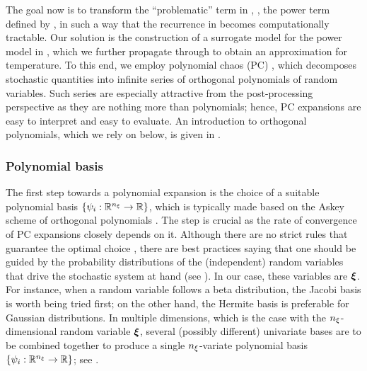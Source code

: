 The goal now is to transform the ``problematic'' term in , \ie, the power term defined by , in such a way that the recurrence in  becomes computationally tractable.
Our solution is the construction of a surrogate model for the power model in , which we further propagate through  to obtain an approximation for temperature.
To this end, we employ polynomial chaos (PC) \cite{xiu2010}, which decomposes stochastic quantities into infinite series of orthogonal polynomials of random variables.
Such series are especially attractive from the post-processing perspective as they are nothing more than polynomials; hence, PC expansions are easy to interpret and easy to evaluate.
An introduction to orthogonal polynomials, which we rely on below, is given in .

\subsubsection{Polynomial basis}
The first step towards a polynomial expansion is the choice of a suitable polynomial basis $\{ \psi_i: \mathbb{R}^{n_\xi} \to \mathbb{R} \}$, which is typically made based on the Askey scheme of orthogonal polynomials \cite{xiu2010}.
The step is crucial as the rate of convergence of PC expansions closely depends on it.
Although there are no strict rules that guarantee the optimal choice \cite{knio2006}, there are best practices saying that one should be guided by the probability distributions of the (independent) random variables that drive the stochastic system at hand (see ).
In our case, these variables are $\boldsymbol{\xi}$.
For instance, when a random variable follows a beta distribution, the Jacobi basis is worth being tried first; on the other hand, the Hermite basis is preferable for Gaussian distributions.
In multiple dimensions, which is the case with the ${n_\xi}$-dimensional random variable $\boldsymbol{\xi}$, several (possibly different) univariate bases are to be combined together to produce a single ${n_\xi}$-variate polynomial basis $\{ \psi_i: \mathbb{R}^{n_\xi} \to \mathbb{R} \}$; see \cite{xiu2010}.

